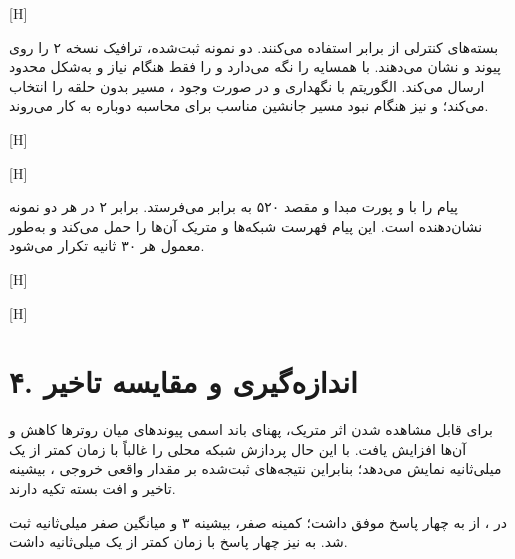[H]

بسته‌های کنترلی  از  برابر 
استفاده می‌کنند. دو نمونه ثبت‌شده، ترافیک  نسخه ۲ را روی پیوند
 و  نشان می‌دهند.  با  همسایه
را نگه می‌دارد و  را فقط هنگام نیاز و به‌شکل محدود ارسال می‌کند.
الگوریتم  با نگهداری  و در صورت وجود
، مسیر بدون حلقه را
انتخاب می‌کند؛  و  نیز هنگام نبود مسیر جانشین مناسب برای
محاسبه دوباره به کار می‌روند.

[H]

[H]

 پیام  را با  و پورت مبدا و مقصد ۵۲۰ به
 برابر  می‌فرستد.  برابر ۲ در هر
دو نمونه نشان‌دهنده  است. این پیام فهرست شبکه‌ها و متریک آن‌ها
را حمل می‌کند و به‌طور معمول هر ۳۰ ثانیه تکرار می‌شود.

[H]

[H]

\section{۴. اندازه‌گیری و مقایسه تاخیر }

برای قابل مشاهده شدن اثر متریک، پهنای باند اسمی پیوندهای میان روترها کاهش و
 آن‌ها افزایش یافت. با این حال  پردازش شبکه محلی
را غالباً با زمان کمتر از یک میلی‌ثانیه نمایش می‌دهد؛ بنابراین نتیجه‌های
ثبت‌شده بر مقدار واقعی خروجی ، بیشینه تاخیر و افت بسته تکیه دارند.

در ،  از  به  چهار پاسخ موفق داشت؛
کمینه صفر، بیشینه ۳ و میانگین صفر میلی‌ثانیه ثبت شد.  به
 نیز چهار پاسخ با زمان کمتر از یک میلی‌ثانیه داشت.

